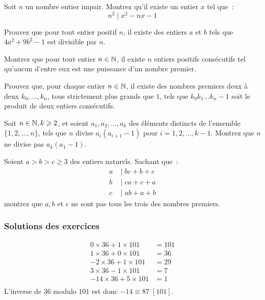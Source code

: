 \begin{exo}
	Soit $n$ un nombre entier impair.
	Montrez qu'il existe un entier $x$ tel que~:
	$$n^2 \;|\; x^2 - nx - 1$$
\end{exo}

\begin{exo}
	Prouvez que pour tout entier positif $n$, il existe des entiers $a$ et $b$ tels que $4a^2 + 9b^2 - 1$ est divisible par $n$.
\end{exo}

\begin{exo}[IMO 1989]
	Montrez que pour tout entier $n \in \mathbb N$, il existe $n$ entiers positifs consécutifs tel qu'aucun d'entre eux est une puissance d'un nombre premier.
\end{exo}

\begin{exo}
	Prouvez que, pour chaque entier $n \in \mathbb N$, il existe des nombres premiers deux à deux $k_0, \dots, k_n$, tous strictement plus grands que $1$, tels que $k_0k_1 \dots k_n - 1$ soit le produit de deux entiers consécutifs.
\end{exo}

\begin{exo}[P1 IMO 2009]
	Soit $n \in \mathbb N, k \geqslant 2$, et soient $a_1, a_2, \dots, a_k$ des éléments distincts de l'ensemble $\{1, 2, \dots, n\}$, tels que $n$ divise $a_i(a_{i + 1} - 1)$ pour $i = 1, 2, \dots, k - 1$. Montrez que $n$ ne divise pas $a_k(a_1 - 1)$.
\end{exo}

\begin{exo}
	Soient $a > b > c \geq 3$ des entiers naturels. Sachant que~:
	\begin{align*}
		a & \;|\; bc + b + c \\
		b & \;|\; ca + c + a \\
		c & \;|\; ab + a + b
	\end{align*}
	montrez que $a, b$ et $c$ ne sont pas tous les trois des nombres premiers.
\end{exo}

\subsubsection{Solutions des exercices}

\begin{sol}
	\begin{align*}
		0 \times 36 + 1 \times 101 &= 101 \\
		1 \times 36 + 0 \times 101 &= 36 \\
		-2 \times 36 + 1 \times 101 &= 29 \\
		3 \times 36 - 1 \times 101 &= 7 \\
		-14 \times 36 + 5 \times 101 &= 1 \\
	\end{align*}
	L'inverse de $36$ modulo $101$ est donc $-14 \equiv 87 \; [101]$.
\end{sol}

